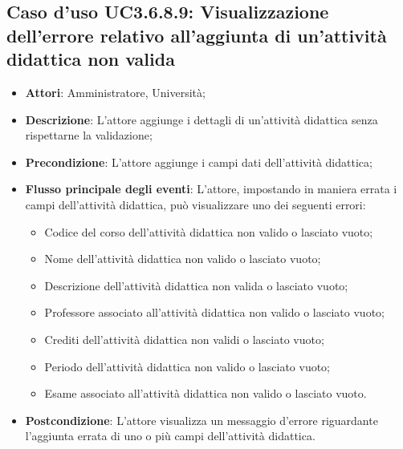 \subsection{Caso d'uso \texorpdfstring{UC3.6.8.9}{UC3.6.8.9}: Visualizzazione dell'errore relativo all’aggiunta di un’attività didattica non valida}
\begin{itemize}
\item \textbf{Attori}: Amministratore, Università;
\item \textbf{Descrizione}: L'attore aggiunge i dettagli di un’attività didattica senza rispettarne la validazione;

\item \textbf{Precondizione}: L'attore aggiunge i campi dati dell’attività didattica;

\item \textbf{Flusso principale degli eventi}: L'attore, impostando in maniera errata i campi dell’attività didattica, può visualizzare uno dei seguenti errori:
\begin{itemize}
\item Codice del corso dell’attività didattica non valido o lasciato vuoto;
\item Nome dell’attività didattica non valido o lasciato vuoto;
\item Descrizione dell’attività didattica non valida o lasciato vuoto;
\item Professore associato all’attività didattica non valido o lasciato vuoto;
\item Crediti dell’attività didattica non validi o lasciato vuoto;
\item Periodo dell’attività didattica non valido o lasciato vuoto;
\item Esame associato all’attività didattica non valido o lasciato vuoto.
\end{itemize}
\item \textbf{Postcondizione}: L'attore visualizza un messaggio d'errore riguardante l'aggiunta errata di uno o più campi dell’attività didattica.

\end{itemize}
